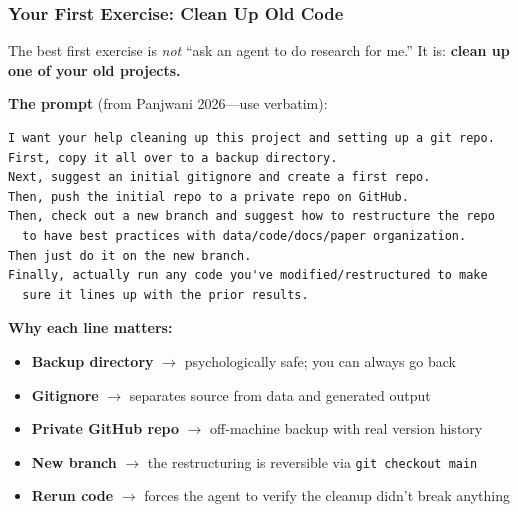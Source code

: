 \documentclass[10pt,english,aspectratio=169]{beamer}
\begin{document}
\begin{frame}[fragile]
\frametitle{Your First Exercise: Clean Up Old Code}

The best first exercise is \textit{not} ``ask an agent to do research for me.'' It is: \textbf{clean up one of your old projects.}

\vspace{0.2cm}

\textbf{The prompt} (from Panjwani 2026---use verbatim):

\begin{lstlisting}[style=pythonstyle,language={},basicstyle=\ttfamily\tiny,numbers=none]
I want your help cleaning up this project and setting up a git repo.
First, copy it all over to a backup directory.
Next, suggest an initial gitignore and create a first repo.
Then, push the initial repo to a private repo on GitHub.
Then, check out a new branch and suggest how to restructure the repo
  to have best practices with data/code/docs/paper organization.
Then just do it on the new branch.
Finally, actually run any code you've modified/restructured to make
  sure it lines up with the prior results.
\end{lstlisting}

\vspace{0.1cm}

\textbf{Why each line matters:}
\begin{itemize}
    \item \textbf{Backup directory} $\to$ psychologically safe; you can always go back
    \item \textbf{Gitignore} $\to$ separates source from data and generated output
    \item \textbf{Private GitHub repo} $\to$ off-machine backup with real version history
    \item \textbf{New branch} $\to$ the restructuring is reversible via \texttt{git checkout main}
    \item \textbf{Rerun code} $\to$ forces the agent to verify the cleanup didn't break anything
\end{itemize}
\end{frame}
\end{document}
